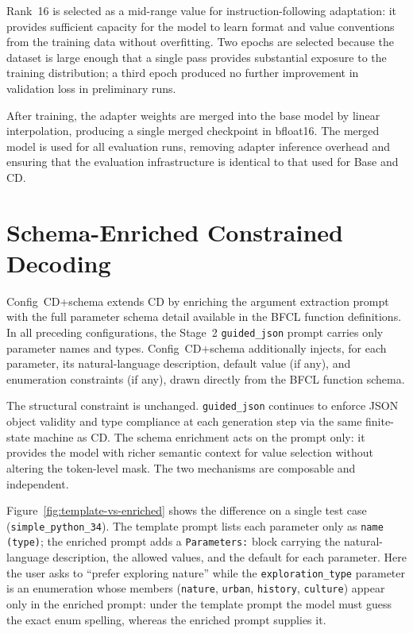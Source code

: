 Rank~16 is selected as a mid-range value for instruction-following adaptation:
it provides sufficient capacity for the model to learn format and value
conventions from the training data without overfitting. Two epochs are selected
because the dataset is large enough that a single pass provides substantial
exposure to the training distribution; a third epoch produced no further
improvement in validation loss in preliminary runs.

After training, the adapter weights are merged into the base model by linear
interpolation, producing a single merged checkpoint in bfloat16. The merged
model is used for all evaluation runs, removing adapter inference overhead and
ensuring that the evaluation infrastructure is identical to that used for
Base and CD.

\section{Schema-Enriched Constrained Decoding}

Config~CD+schema extends CD by enriching the argument extraction prompt
with the full parameter schema detail available in the BFCL function
definitions. In all preceding configurations, the Stage~2
\texttt{guided\_json} prompt carries only parameter names and types.
Config~CD+schema additionally injects, for each parameter, its natural-language
description, default value (if any), and enumeration constraints (if any),
drawn directly from the BFCL function schema.

The structural constraint is unchanged. \texttt{guided\_json} continues
to enforce JSON object validity and type compliance at each generation
step via the same finite-state machine as CD. The schema enrichment
acts on the prompt only: it provides the model with richer semantic
context for value selection without altering the token-level mask.
The two mechanisms are composable and independent.

Figure~\ref{fig:template-vs-enriched} shows the difference on a single
test case (\texttt{simple\_python\_34}). The template prompt lists each
parameter only as \texttt{name (type)}; the enriched prompt adds a
\texttt{Parameters:} block carrying the natural-language description,
the allowed values, and the default for each parameter. Here the user
asks to ``prefer exploring nature'' while the \texttt{exploration\_type}
parameter is an enumeration whose members
(\texttt{nature}, \texttt{urban}, \texttt{history}, \texttt{culture})
appear only in the enriched prompt: under the template prompt the model
must guess the exact enum spelling, whereas the enriched prompt supplies it.

